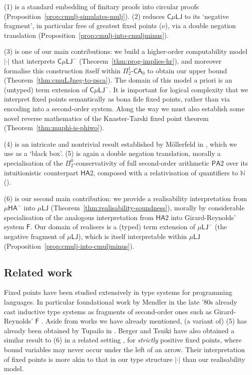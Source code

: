 \documentclass[10pt,a4paper]{amsart}
\theoremstyle{plain}
\theoremstyle{definition}
\theoremstyle{plain}
\theoremstyle{definition} %
\newcommand{\Nat}{\mathbb{N}}
\newcommand{\LJ}{\mathsf{LJ}}
\newcommand{\F}{\mathsf{F}}
\newcommand{\muLJ}{\mu\LJ}
\newcommand{\muLJneg}{\muLJ^-}
\newcommand{\circular}{\mathsf C}
\newcommand{\cmuLJ}{\circular\muLJ}
\newcommand{\cmuLJneg}{\cmuLJ^-}
\newcommand{\MALL}{\mathsf{MALL}}
\newcommand{\muMALL}{\mu\MALL}
\newcommand{\Pin}[2]{\Pi^{#1}_{#2}}
\newcommand{\PA}{\mathsf{PA}}
\newcommand{\HA}{\mathsf{HA}}
\newcommand{\muHA}{\mu\HA}
\newcommand{\SOPA}{\PA2}
\newcommand{\SOHA}{\HA2}
\newcommand{\CA}{\mathsf{CA}}
\newcommand{\ca}[1]{#1\text{-}\CA}
\newcommand{\PSCA}{\ca{\Pin 1 2 }_0}
\newcommand{\hr}[1]{|#1|}
\newcommand{\HR}{\hr \cdot}
\newcommand{\muHAneg}{\muHA^-}
\begin{document}
(1) is a standard embedding of finitary proofs into circular proofs (Proposition~\ref{prop:cmulj-simulates-mulj}).
(2) reduces $\cmuLJ$ to its `negative fragment', in particular free of greatest fixed points ($\nu$), via a double negation translation (Proposition~\ref{prop:cmulj-into-cmuljminus}). 


(3) is one of our main contributions: we build a higher-order computability model $\HR$ that interprets $\cmuLJneg$ (Theorem~\ref{thm:prog-implies-hr}), and moreover formalise this construction itself within $\PSCA$ to obtain our upper bound (Theorem~\ref{thm:cmuLJneg-to-psca}).
The domain of this model a priori is an (untyped) term extension of $\cmuLJneg$.
It is important for logical complexity that we interpret fixed points semantically as bona fide fixed points, rather than via encoding into a second-order system.
Along the way we must also establish some novel reverse mathematics of the Knaster-Tarski fixed point theorem (Theorem~\ref{thm:muphi-is-phiwo}).

(4) is an intricate and nontrivial result established by M\"ollerfeld in \cite{Moellerfeld02:phd-thesis}, which we use as a `black box'.
(5) is again a double negation translation, morally a specialisation of the $\Pin 0 2 $-conservativity of full second-order arithmetic $\SOPA$ over its intuitionistic counterpart $\SOHA$, composed with a relativisation of quantifiers to $\Nat$ (). 

(6) is our second main contribution: we provide a realisability interpretation from $\muHAneg$ into $\muLJ$ (Theorem~\ref{thm:realisability-soundness}), morally by considerable specialisation of the analogous interpretation from $\SOHA$ into Girard-Reynolds' system $\F$.
Our domain of realisers is a (typed) term extension of $\muLJneg$ (the negative fragment of $\muLJ$), which is itself interpretable within $\muLJ$ (Proposition~\ref{prop:cmulj-into-cmuljminus}).




\subsection{Related work}
Fixed points have been studied extensively in type systems for programming languages.
In particular foundational work by Mendler in the late '80s \cite{Mendler87:recursive-types,Mendler91:inductive-types} already cast inductive type systems as fragments of second-order ones such as Girard-Reynolds' $\F$ \cite{girard1972systemF,Reynolds74systemF}.
Aside from works we have already mentioned, (a variant of) (5) has already been obtained by Tupailo in \cite{Tupailo04doubleneg}.
Berger and Tsuiki have also obtained a similar result to (6) in a related setting \cite{BerTsu21:ifp}, for \emph{strictly} positive fixed points, where bound variables may never occur under the left of an arrow. 
Their interpretation of fixed points is more akin to that in our type structure $\HR$ than our realisability model.
\end{document}
